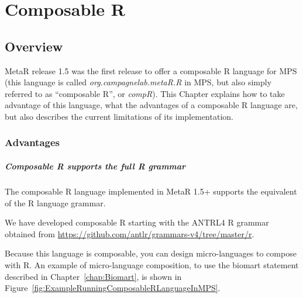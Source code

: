 


\chapter{Composable R}\label{chap:ComposableR}
\section{Overview}
MetaR release 1.5 was the first release to offer a composable R language for MPS (this language is called \textit{org.campagnelab.metaR.R} in MPS, but also simply referred to as ``composable R'', or \textit{compR}). This Chapter explains how to take advantage of this language, what the advantages of a composable R language are, but also describes the current limitations of its implementation.

\subsection{Advantages}
\paragraph{Composable R supports the full R grammar}

The composable R language implemented in MetaR 1.5+ supports  the equivalent of the R language grammar. 
\begin{remark}
We have developed composable R starting with the ANTRL4 R grammar obtained from \url{https://github.com/antlr/grammars-v4/tree/master/r}. 
\end{remark}
Because this language is composable, you can design micro-languages to compose with R. An example of micro-language composition, to use the biomart statement described in Chapter~\ref{chap:Biomart}, is shown in Figure~\ref{fig:ExampleRunningComposableRLanguageInMPS}.

